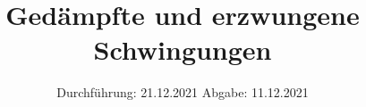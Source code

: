 

\subject{V354}
\title{Gedämpfte und erzwungene Schwingungen}
\date{%
  Durchführung: 21.12.2021
  \hspace{3em}
  Abgabe: 11.12.2021
}



\maketitle
\thispagestyle{empty}
\tableofcontents
\newpage






\printbibliography{}


